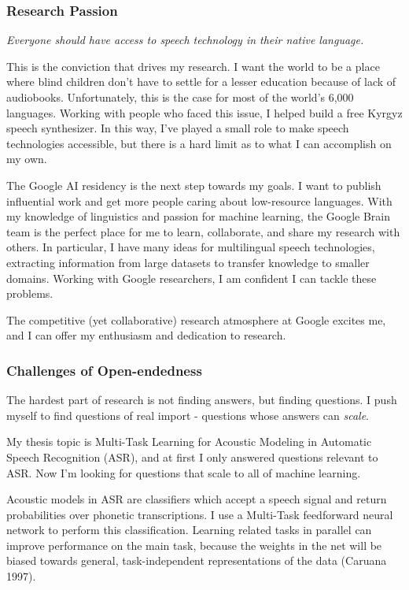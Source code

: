 \documentclass[12pt,a4paper]{article}
\begin{document}
\subsubsection*{Research Passion}



\begin{center}
\textit{Everyone should have access to speech technology in their native language.}
\end{center}

This is the conviction that drives my research. I want the world to be a place where blind children don't have to settle for a lesser education because of lack of audiobooks. Unfortunately, this is the case for most of the world's 6,000 languages. Working with people who faced this issue, I helped build a free Kyrgyz speech synthesizer. In this way, I've played a small role to make speech technologies accessible, but there is a hard limit as to what I can accomplish on my own.

The Google AI residency is the next step towards my goals. I want to publish influential work and get more people caring about low-resource languages. With my knowledge of linguistics and passion for machine learning, the Google Brain team is the perfect place for me to learn, collaborate, and share my research with others. In particular, I have many ideas for multilingual speech technologies, extracting information from large datasets to transfer knowledge to smaller domains. Working with Google researchers, I am confident I can tackle these problems.

The competitive (yet collaborative) research atmosphere at Google excites me, and I can offer my enthusiasm and dedication to research. 


\subsubsection*{Challenges of Open-endedness}

The hardest part of research is not finding answers, but finding questions. I push myself to find questions of real import - questions whose answers can \textit{scale}.

My thesis topic is Multi-Task Learning for Acoustic Modeling in Automatic Speech Recognition (ASR), and at first I only answered questions relevant to ASR. Now I'm looking for questions that scale to all of machine learning.

Acoustic models in ASR are classifiers which accept a speech signal and return probabilities over phonetic transcriptions. I use a Multi-Task feedforward neural network to perform this classification. Learning related tasks in parallel can improve performance on the main task, because the weights in the net will be biased towards general, task-independent representations of the data (Caruana 1997).
\end{document}
